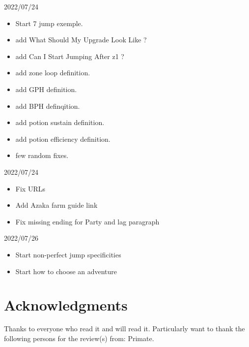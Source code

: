 \documentclass{article}
\begin{document}
2022/07/24
\begin{itemize}
    \item Start 7 jump exemple.
    \item add What Should My Upgrade Look Like ?
    \item add Can I Start Jumping After z1 ?
    \item add zone loop definition.
    \item add GPH definition.
    \item add BPH definqition.
    \item add potion sustain definition.
    \item add potion efficiency definition.
    \item few random fixes.
\end{itemize}

2022/07/24
\begin{itemize}
    \item Fix URLs
    \item Add Azaka farm guide link
    \item Fix missing ending for Party and lag paragraph
\end{itemize}
    
2022/07/26
\begin{itemize}
    \item Start non-perfect jump specificities
    \item Start how to choose an adventure
\end{itemize}
    
\section{Acknowledgments}

Thanks to everyone who read it and will read it.
Particularly want to thank the following persons for the review(s) from: Primate.
\end{document}
